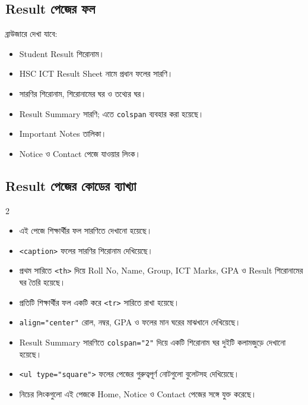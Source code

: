 \subsection{Result পেজের ফল}

ব্রাউজারে দেখা যাবে:
\par\noindent
\begin{minipage}[t]{.48\linewidth}\vspace{0pt}
\begin{itemize}
\item Student Result শিরোনাম।
\item HSC ICT Result Sheet নামে প্রধান ফলের সারণি।
\item সারণির শিরোনাম, শিরোনামের ঘর ও তথ্যের ঘর।
\end{itemize}
\end{minipage}\hfill
\begin{minipage}[t]{.48\linewidth}\vspace{0pt}
\begin{itemize}
\item Result Summary সারণি; এতে \texttt{colspan} ব্যবহার করা হয়েছে।
\item Important Notes তালিকা।
\item Notice ও Contact পেজে যাওয়ার লিংক।
\end{itemize}
\end{minipage}\par


\subsection{Result পেজের কোডের ব্যাখ্যা}

\par\noindent
\begin{multicols}{2}
\begin{itemize}
\item এই পেজে শিক্ষার্থীর ফল সারণিতে দেখানো হয়েছে।
\item \texttt{<caption>} ফলের সারণির শিরোনাম দেখিয়েছে।
\item প্রথম সারিতে \texttt{<th>} দিয়ে Roll No, Name, Group, ICT Marks, GPA ও Result শিরোনামের ঘর তৈরি হয়েছে।
\item প্রতিটি শিক্ষার্থীর ফল একটি করে \texttt{<tr>} সারিতে রাখা হয়েছে।


\item \texttt{align="center"} রোল, নম্বর, GPA ও ফলের মান ঘরের মাঝখানে দেখিয়েছে।
\item Result Summary সারণিতে \texttt{colspan="2"} দিয়ে একটি শিরোনাম ঘর দুইটি কলামজুড়ে দেখানো হয়েছে।
\item \texttt{<ul type="square">} ফলের পেজের গুরুত্বপূর্ণ নোটগুলো বুলেটসহ দেখিয়েছে।
\item নিচের লিংকগুলো এই পেজকে Home, Notice ও Contact পেজের সঙ্গে যুক্ত করেছে।
\end{itemize}
\end{multicols}
\par


